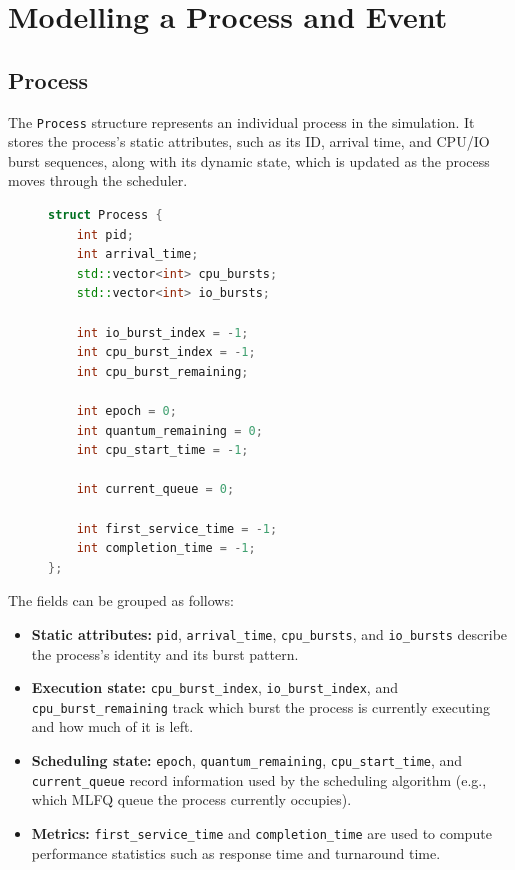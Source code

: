 \documentclass[12pt]{article}
\begin{document}
\section{Modelling a Process and Event}

\subsection{Process}

The \texttt{Process} structure represents an individual process in the simulation. It stores the process's static attributes, such as its ID, arrival time, and CPU/IO burst sequences, along with its dynamic state, which is updated as the process moves through the scheduler.

\begin{figure}[htbp]
\centering
\begin{lstlisting}[language=C++, caption={Data structure representing an individual process.}, label={lst:process_struct}]
struct Process {
    int pid;
    int arrival_time;
    std::vector<int> cpu_bursts;
    std::vector<int> io_bursts;

    int io_burst_index = -1;
    int cpu_burst_index = -1;
    int cpu_burst_remaining;

    int epoch = 0;
    int quantum_remaining = 0;
    int cpu_start_time = -1;

    int current_queue = 0;

    int first_service_time = -1;
    int completion_time = -1;
};
\end{lstlisting}
\end{figure}

The fields can be grouped as follows:
\begin{itemize}
    \item \textbf{Static attributes:} \texttt{pid}, \texttt{arrival\_time}, \texttt{cpu\_bursts}, and \texttt{io\_bursts} describe the process's identity and its burst pattern.
    \item \textbf{Execution state:} \texttt{cpu\_burst\_index}, \texttt{io\_burst\_index}, and \texttt{cpu\_burst\_remaining} track which burst the process is currently executing and how much of it is left.
    \item \textbf{Scheduling state:} \texttt{epoch}, \texttt{quantum\_remaining}, \texttt{cpu\_start\_time}, and \texttt{current\_queue} record information used by the scheduling algorithm (e.g., which MLFQ queue the process currently occupies).
    \item \textbf{Metrics:} \texttt{first\_service\_time} and \texttt{completion\_time} are used to compute performance statistics such as response time and turnaround time.
\end{itemize}
\end{document}
